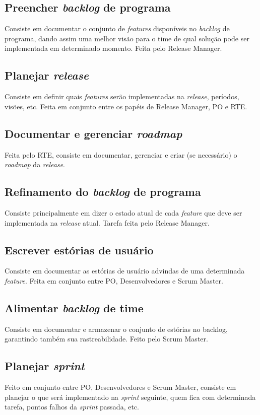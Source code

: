 \subsection{Preencher \emph{backlog} de programa}
Consiste em documentar o conjunto de \emph{features} disponíveis no \emph{backlog} de programa, dando assim uma melhor visão para o time de qual solução pode ser implementada em determinado momento. Feita pelo Release Manager.

\subsection{Planejar \emph{release}}
Consiste em definir quais \emph{features} serão implementadas na \emph{release}, períodos, visões, etc. Feita em conjunto entre os papéis de Release Manager, PO e RTE.

\subsection{Documentar e gerenciar \emph{roadmap}}
Feita pelo RTE, consiste em documentar, gerenciar e criar (se necessário) o \emph{roadmap} da \emph{release}.

\subsection{Refinamento do \emph{backlog} de programa}
Consiste principalmente em dizer o estado atual de cada \emph{feature} que deve ser implementada na \emph{release} atual. Tarefa feita pelo Release Manager.

\subsection{Escrever estórias de usuário}
Consiste em documentar as estórias de usuário advindas de uma determinada \emph{feature}. Feita em conjunto entre PO, Desenvolvedores e Scrum Master.

\subsection{Alimentar \emph{backlog} de time}
Consiste em documentar e armazenar o conjunto de estórias no backlog, garantindo também sua rastreabilidade. Feito pelo Scrum Master.

\subsection{Planejar \emph{sprint}}
Feito em conjunto entre PO, Desenvolvedores e Scrum Master, consiste em planejar o que será implementado na \emph{sprint} seguinte, quem fica com determinada tarefa, pontos falhos da \emph{sprint} passada, etc.

